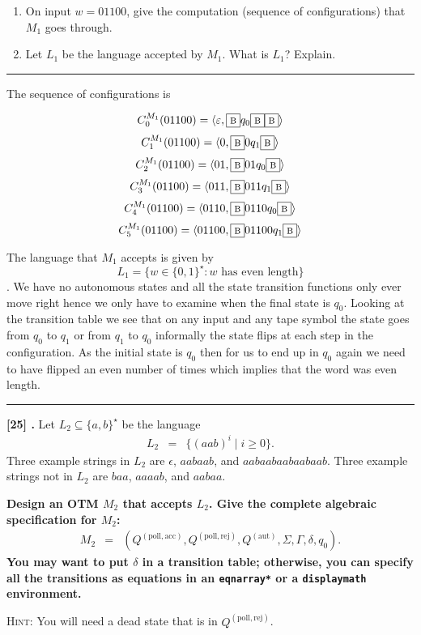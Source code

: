 \documentclass[11pt,twoside]{article}
\newcounter{problem}
\newcommand{\problem}[1]{%
\refstepcounter{problem}\noindent\textbf{[#1] \arabic{problem}.}}
\newcommand{\solution}{\bigskip\hrule\bigskip}
\newcommand{\problembreak}{\bigskip\hrule\bigskip}
\newcommand{\emptystring}{\epsilon}
\newcommand{\Qpollacc}{Q^{\left(\mathrm{poll,acc}\right)}}
\newcommand{\Qpollrej}{Q^{\left(\mathrm{poll,rej}\right)}}
\newcommand{\Qaut}{Q^{\left(\mathrm{aut}\right)}}
\newcommand{\blank}{\ensuremath\fbox{\sc b}}
\begin{document}
{\bfseries
\begin{enumerate}

\item
On input $w=01100$,
give the computation
(sequence of configurations)
that $M_1$ goes through.

\item
Let $L_1$ be the language accepted by $M_1$.
What is $L_1$?
Explain.

\end{enumerate}
}



\solution


The sequence of configurations is 

 \[C_{0}^{M_1}(01100)=\langle \varepsilon, \blank q_0 \blank \blank\rangle \]
\[C_{1}^{M_1}(01100)=\langle 0, \blank 0 q_1\blank  \rangle\]
\[C_{2}^{M_1}(01100)=\langle 01,\blank 0 1 q_0 \blank \rangle\]
\[C_3^{M_1}(01100)=\langle 011 , \blank 01 1 q_1\blank\rangle \]
\[C_4^{M_1}(01100)=\langle 0110,\blank 01 1 0 q_0\blank\rangle\]
\[C_5^{M_1}(01100)=\langle 01100,\blank 01100 q_1 \blank \rangle \]


The language that $M_1$ accepts is given by $$L_1=\{w\in \{0,1\}^\star: w \text{ has even length} \}$$.
We have no autonomous states and all the state transition functions only ever move right hence we only have to examine when the final state is $q_0$. Looking at the transition table we see that on any input and any tape symbol the state goes from $q_0$ to $q_1$ or from $q_1$ to $q_0$ informally the state flips at each step in the configuration. As the initial state is $q_0$ then for us to end up in $q_0$ again we need to have flipped an even number of times which implies that the word was even length.

\problembreak

\clearpage

\problem{25}
Let $L_2\subseteq\{a,b\}^\star$ be the language
\begin{eqnarray*}
L_2
& = &
\{(aab)^i\mid i\geq0\}.
\end{eqnarray*}
Three example strings in $L_2$ are
$\emptystring$,
$aabaab$, and $aabaabaabaabaab$.
Three example strings not in $L_2$ are
$baa$, $aaaab$, and $aabaa$.

{\bfseries
Design an OTM $M_2$
that accepts $L_2$.
Give the complete algebraic specification for $M_2$:
\begin{eqnarray*}
M_2
& = &
(\Qpollacc,\Qpollrej,\Qaut,\Sigma,\Gamma,\delta,q_0).
\end{eqnarray*}
You may want to put $\delta$ in a transition table;
otherwise,
you can specify all the transitions
as equations
in an \verb,eqnarray*, or a \verb,displaymath, environment.

{\normalfont\textsc{Hint:}}
You will need a dead state that is in $\Qpollrej$.

}
\end{document}
